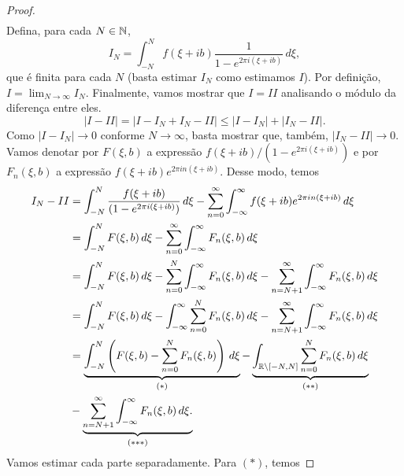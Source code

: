 \begin{proof}
\begin{align*}
        \end{align*}
        Defina, para cada $N\in \mathbb{N}$,
        \begin{equation*}
            I_N = \int_{-N}^{N}f(\xi + ib)\frac{1}{1 - e^{2\pi i(\xi + ib)}} \, d\xi,
        \end{equation*}
        que é finita para cada $N$ (basta estimar $I_N$ como estimamos $I$).
        Por definição, $I = \displaystyle{\lim_{N\to\infty} I_N}$. 
        Finalmente, vamos mostrar que $I = II$ 
        analisando o módulo da diferença entre eles.
        \begin{equation*}
            |I - II|  = |I - I_N + I_N - II| \leq |I-I_N| + |I_N - II|.
        \end{equation*}
        Como $|I - I_N| \to 0$ conforme $N \to \infty$, basta mostrar que, também, 
        $|I_N - II| \to 0$. Vamos denotar por $F(\xi,b)$ a expressão 
        $f(\xi + ib)/(1 - e^{2\pi i(\xi + ib)})$ e por $F_n(\xi,b)$ a expressão 
        $f(\xi + ib)e^{2\pi in(\xi + ib)}$. Desse modo, temos
        \begin{align*}
            I_N - II &= \int_{-N}^{N} \frac{f(\xi + ib)}{(1 - e^{2\pi i(\xi + ib)})}
            \, d\xi - \sum_{n=0}^{\infty}\int_{-\infty}^{\infty} f(\xi + ib)
            e^{2\pi in(\xi + ib)} \, d\xi \\
            &=\int_{-N}^{N} F(\xi,b) \, d\xi -
            \sum_{n=0}^{\infty}\int_{-\infty}^{\infty}F_n(\xi,b) \, d\xi \\
            &= \int_{-N}^{N} F(\xi,b) \, d\xi - 
            \sum_{n=0}^{N}\int_{-\infty}^{\infty}F_n(\xi,b) \, d\xi - 
            \sum_{n= N+1}^{\infty}\int_{-\infty}^{\infty}F_n(\xi,b) \, d\xi\\
            &= \int_{-N}^{N} F(\xi,b) \, d\xi - \int_{-\infty}^{\infty} 
            \sum_{n=0}^{N}F_n(\xi,b) \, d\xi - 
            \sum_{n= N+1}^{\infty}\int_{-\infty}^{\infty}F_n(\xi,b) \, d\xi\\
            &= \underbrace{\int_{-N}^{N} \left(F(\xi,b) - \sum_{n=0}^{N}F_n(\xi,b) 
            \right)\, d\xi}_{(*)} - 
            \underbrace{\int_{\mathbb{R} \setminus [-N,N]}\sum_{n=0}^{N}F_n(\xi,b) 
            \, d\xi}_{(**)} \\ &- 
            \underbrace{\sum_{n= N+1}^{\infty}\int_{-\infty}^{\infty}F_n(\xi,b) 
            \, d\xi.}_{(***)}
        \end{align*}
        Vamos estimar cada parte separadamente. Para $(*)$, temos

\end{proof}
